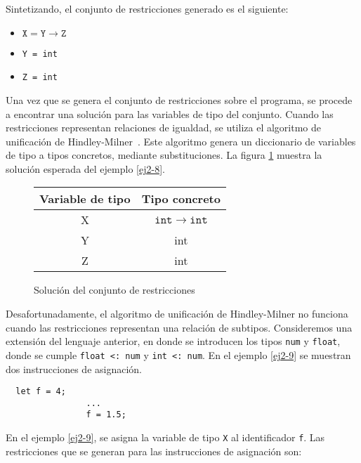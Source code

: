Sintetizando, el conjunto de restricciones generado es el siguiente:

\begin{itemize}
  \item $\mathtt{X = Y \rightarrow Z}$
  \item \texttt{Y = int}
  \item \texttt{Z = int}
\end{itemize}

Una vez que se genera el conjunto de restricciones sobre el programa, se procede a encontrar una solución para las variables de tipo del conjunto. Cuando las restricciones representan relaciones de igualdad, se utiliza el algoritmo de unificación de Hindley-Milner~\cite{damasmilner}. Este algoritmo genera un diccionario de variables de tipo a tipos concretos, mediante substituciones. La figura \ref{tabla2} muestra la solución esperada del ejemplo \ref{ej2-8}.

\begin{figure}[ht]
  \centering
  \ttfamily
  \begin{tabular}{c c}
    Variable de tipo & Tipo concreto \\
    \hline
    X & $\mathtt{int \rightarrow int}$  \\
    Y & int \\
    Z & int \\
  \end{tabular}
  \caption{Solución del conjunto de restricciones}
  \label{tabla2}
\end{figure}

Desafortunadamente, el algoritmo de unificación de Hindley-Milner no funciona cuando las restricciones representan una relación de subtipos. Consideremos una extensión del lenguaje anterior,  en donde se introducen los tipos \texttt{num} y \texttt{float}, donde se cumple \texttt{float <: num} y \texttt{int <: num}. En el ejemplo \ref{ej2-9} se muestran dos instrucciones de asignación.
\vspace{0.8em}
\begin{ej}
  \normalfont
  \label{ej2-9}
\begin{lstlisting}
  let f = 4;
                ...
                f = 1.5;
\end{lstlisting}
\end{ej}

En el ejemplo \ref{ej2-9}, se asigna la variable de tipo \texttt{X} al identificador \texttt{f}. Las restricciones que se generan para las instrucciones de asignación son:

